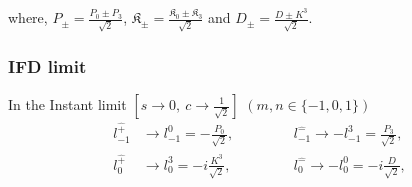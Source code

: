 \documentclass[]{article}
\numberwithin{equation}{section}
\begin{document}
{{where, $P_{\pm}=\frac{P_{0}\pm P_{3}}{\sqrt{2}}$, $\mathfrak{K}_{\pm}=\frac{\mathfrak{K}_{0}\pm \mathfrak{K}_{3}}{\sqrt{2}}$ and $D_{\pm}=\frac{D\pm{K^{3}}}{\sqrt{2}}$.

\subsubsection{IFD limit}
In the Instant limit $[s\longrightarrow0,~c\longrightarrow\frac{1}{\sqrt{2}}]$ $(m,n\in\{-1,0,1\})$
\begin{align}
    l^{\hat{+}}_{-1}&\longrightarrow l^{0}_{-1}=-\frac{P_{0}}{\sqrt{2}},~~~~~~~~~~~~&&l^{\hat{-}}_{-1}\longrightarrow -l^{3}_{-1}= \frac{P_{3}}{\sqrt{2}},\\
    l^{\hat{+}}_{0}&\longrightarrow l^{3}_{0}=-i\frac{K^{3}}{\sqrt{2}},~~~~~~~~~~~~&&l^{\hat{-}}_{0}\longrightarrow -l^{0}_{0}= -i\frac{D}{\sqrt{2}},\\

\end{align}}}
\end{document}
